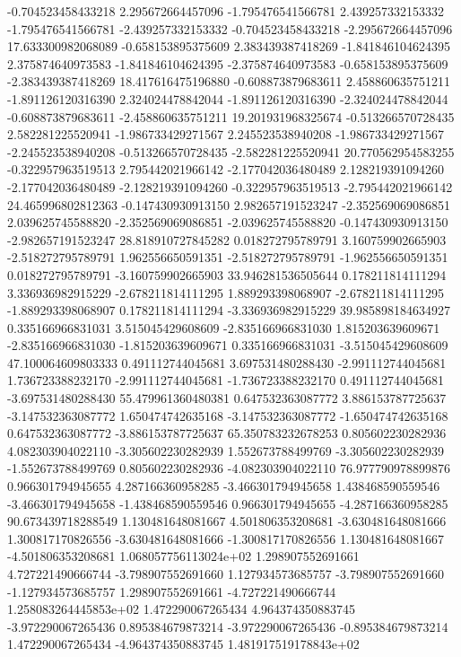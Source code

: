 {-0.704523458433218	2.295672664457096	-1.795476541566781	2.439257332153332	-1.795476541566781	-2.439257332153332	-0.704523458433218	-2.295672664457096	17.633300982068089
-0.658153895375609	2.383439387418269	-1.841846104624395	2.375874640973583	-1.841846104624395	-2.375874640973583	-0.658153895375609	-2.383439387418269	18.417616475196880
-0.608873879683611	2.458860635751211	-1.891126120316390	2.324024478842044	-1.891126120316390	-2.324024478842044	-0.608873879683611	-2.458860635751211	19.201931968325674
-0.513266570728435	2.582281225520941	-1.986733429271567	2.245523538940208	-1.986733429271567	-2.245523538940208	-0.513266570728435	-2.582281225520941	20.770562954583255
-0.322957963519513	2.795442021966142	-2.177042036480489	2.128219391094260	-2.177042036480489	-2.128219391094260	-0.322957963519513	-2.795442021966142	24.465996802812363
-0.147430930913150	2.982657191523247	-2.352569069086851	2.039625745588820	-2.352569069086851	-2.039625745588820	-0.147430930913150	-2.982657191523247	28.818910727845282
0.018272795789791	3.160759902665903	-2.518272795789791	1.962556650591351	-2.518272795789791	-1.962556650591351	0.018272795789791	-3.160759902665903	33.946281536505644
0.178211814111294	3.336936982915229	-2.678211814111295	1.889293398068907	-2.678211814111295	-1.889293398068907	0.178211814111294	-3.336936982915229	39.985898184634927
0.335166966831031	3.515045429608609	-2.835166966831030	1.815203639609671	-2.835166966831030	-1.815203639609671	0.335166966831031	-3.515045429608609	47.100064609803333
0.491112744045681	3.697531480288430	-2.991112744045681	1.736723388232170	-2.991112744045681	-1.736723388232170	0.491112744045681	-3.697531480288430	55.479961360480381
0.647532363087772	3.886153787725637	-3.147532363087772	1.650474742635168	-3.147532363087772	-1.650474742635168	0.647532363087772	-3.886153787725637	65.350783232678253
0.805602230282936	4.082303904022110	-3.305602230282939	1.552673788499769	-3.305602230282939	-1.552673788499769	0.805602230282936	-4.082303904022110	76.977790978899876
0.966301794945655	4.287166360958285	-3.466301794945658	1.438468590559546	-3.466301794945658	-1.438468590559546	0.966301794945655	-4.287166360958285	90.673439718288549
1.130481648081667	4.501806353208681	-3.630481648081666	1.300817170826556	-3.630481648081666	-1.300817170826556	1.130481648081667	-4.501806353208681	1.068057756113024e+02
1.298907552691661	4.727221490666744	-3.798907552691660	1.127934573685757	-3.798907552691660	-1.127934573685757	1.298907552691661	-4.727221490666744	1.258083264445853e+02
1.472290067265434	4.964374350883745	-3.972290067265436	0.895384679873214	-3.972290067265436	-0.895384679873214	1.472290067265434	-4.964374350883745	1.481917519178843e+02
}
